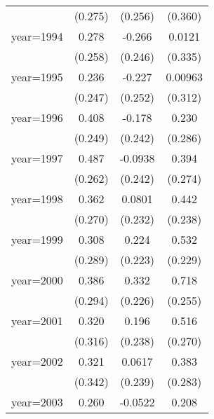 {\begin{tabular}{l*{3}{c}}
                    &     (0.275)         &     (0.256)         &     (0.360)         \\
[1em]
year=1994           &       0.278         &      -0.266         &      0.0121         \\
                    &     (0.258)         &     (0.246)         &     (0.335)         \\
[1em]
year=1995           &       0.236         &      -0.227         &     0.00963         \\
                    &     (0.247)         &     (0.252)         &     (0.312)         \\
[1em]
year=1996           &       0.408         &      -0.178         &       0.230         \\
                    &     (0.249)         &     (0.242)         &     (0.286)         \\
[1em]
year=1997           &       0.487         &     -0.0938         &       0.394         \\
                    &     (0.262)         &     (0.242)         &     (0.274)         \\
[1em]
year=1998           &       0.362         &      0.0801         &       0.442         \\
                    &     (0.270)         &     (0.232)         &     (0.238)         \\
[1em]
year=1999           &       0.308         &       0.224         &       0.532\sym{*}  \\
                    &     (0.289)         &     (0.223)         &     (0.229)         \\
[1em]
year=2000           &       0.386         &       0.332         &       0.718\sym{**} \\
                    &     (0.294)         &     (0.226)         &     (0.255)         \\
[1em]
year=2001           &       0.320         &       0.196         &       0.516         \\
                    &     (0.316)         &     (0.238)         &     (0.270)         \\
[1em]
year=2002           &       0.321         &      0.0617         &       0.383         \\
                    &     (0.342)         &     (0.239)         &     (0.283)         \\
[1em]
year=2003           &       0.260         &     -0.0522         &       0.208         \\

\end{tabular}}
